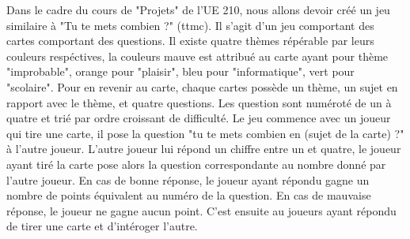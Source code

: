 Dans le cadre du cours de "Projets" de l'UE 210, nous allons devoir créé un jeu similaire à "Tu te mets combien ?" (ttmc). Il s'agit d'un jeu comportant des cartes comportant des questions. Il existe quatre thèmes répérable par leurs couleurs 
respéctives, la couleurs mauve est attribué au carte ayant pour thème "improbable", orange pour "plaisir", bleu pour "informatique", vert pour "scolaire". Pour en revenir au carte, chaque cartes possède un thème, un sujet en rapport avec le thème,
et quatre questions. Les question sont numéroté de un à quatre et trié par ordre croissant de difficulté. Le jeu commence avec un joueur qui tire une carte, il pose la question "tu te mets combien en (sujet de la carte) ?" à l'autre joueur. L'autre
joueur lui répond un chiffre entre un et quatre, le joueur ayant tiré la carte pose alors la question correspondante au nombre donné par l'autre joueur. En cas de bonne réponse, le joueur ayant répondu gagne un nombre de points équivalent au numéro 
de la question. En cas de mauvaise réponse, le joueur ne gagne aucun point. C'est ensuite au joueurs ayant répondu de tirer une carte et d'intéroger l'autre.
   
